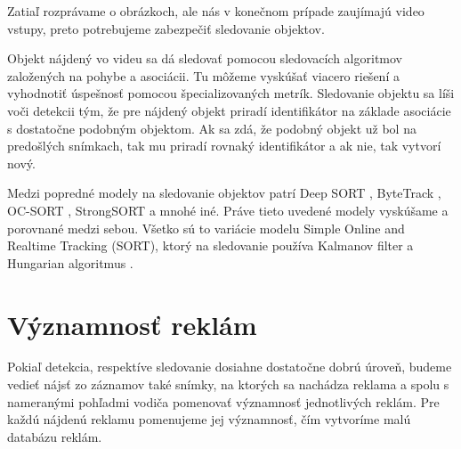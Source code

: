 Zatiaľ rozprávame o obrázkoch, ale nás v konečnom prípade zaujímajú video vstupy, preto potrebujeme zabezpečiť sledovanie objektov. 

Objekt nájdený vo videu sa dá sledovať pomocou sledovacích algoritmov založených na pohybe a asociácii. Tu môžeme vyskúšať viacero riešení a vyhodnotiť úspešnosť pomocou špecializovaných metrík. Sledovanie objektu sa líši voči detekcii tým, že pre nájdený objekt priradí identifikátor na základe asociácie s dostatočne podobným objektom. Ak sa zdá, že podobný objekt už bol na predošlých snímkach, tak mu priradí rovnaký identifikátor a ak nie, tak vytvorí nový. 

Medzi popredné modely na sledovanie objektov patrí Deep SORT \cite{deepsort}, ByteTrack \cite{bytetrack}, OC-SORT \cite{ocsort}, StrongSORT \cite{strongsort} a mnohé iné. Práve tieto uvedené modely vyskúšame a porovnané medzi sebou. Všetko sú to variácie modelu Simple Online and Realtime Tracking (SORT), ktorý na sledovanie používa Kalmanov filter a Hungarian algoritmus \cite{sort}.



\section{Významnosť reklám}

Pokiaľ detekcia, respektíve sledovanie dosiahne dostatočne dobrú úroveň, budeme vedieť nájsť zo záznamov také snímky, na ktorých sa nachádza reklama a spolu s nameranými pohľadmi vodiča pomenovať významnosť jednotlivých reklám. Pre každú nájdenú reklamu pomenujeme jej významnosť, čím vytvoríme malú databázu reklám. 

